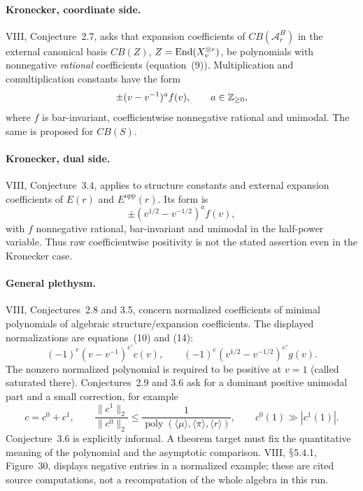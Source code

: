 \documentclass[11pt,a4paper]{article}
\renewcommand{\S}{\ensuremath{\mathsection}}
\theoremstyle{named}\newtheorem{finding}{Finding}[section]
\theoremstyle{definition}\newtheorem{definition}[finding]{Definition}
\theoremstyle{remark}\newtheorem{remark}[finding]{Remark}
\begin{document}
\paragraph{Kronecker, coordinate side.}
VIII, Conjecture~2.7, asks that expansion coefficients of $CB(\mathcal A_r^H)$ in the external canonical basis $CB(Z)$, $Z=\operatorname{End}(X_v^{\otimes r})$, be polynomials with nonnegative \emph{rational} coefficients (equation~(9)). Multiplication and comultiplication constants have the form
\begin{equation}\label{eq:kroneckerpositive}
 \pm(v-v^{-1})^a f(v),\qquad a\in\mathbb Z_{\ge0},
\end{equation}
where $f$ is bar-invariant, coefficientwise nonnegative rational and unimodal. The same is proposed for $CB(S)$.

\paragraph{Kronecker, dual side.}
VIII, Conjecture~3.4, applies to structure constants and external expansion coefficients of $E(r)$ and $E^{\mathrm{opp}}(r)$. Its form is
\begin{equation}\label{eq:dualpositive}
 \pm(v^{1/2}-v^{-1/2})^a f(v),
\end{equation}
with $f$ nonnegative rational, bar-invariant and unimodal in the half-power variable. Thus raw coefficientwise positivity is not the stated assertion even in the Kronecker case.

\paragraph{General plethysm.}
VIII, Conjectures~2.8 and 3.5, concern normalized coefficients of minimal polynomials of algebraic structure/expansion coefficients. The displayed normalizations are equations~(10) and (14):
\[
 (-1)^e(v-v^{-1})^{e'}c(v),\qquad
 (-1)^e(v^{1/2}-v^{-1/2})^{e'}g(v).
\]
The nonzero normalized polynomial is required to be positive at $v=1$ (called saturated there). Conjectures~2.9 and 3.6 ask for a dominant positive unimodal part and a small correction, for example
\[
 c=c^0+c^1,\qquad
 \frac{\|c^1\|_2}{\|c^0\|_2}
 \le\frac1{\operatorname{poly}(\langle\mu\rangle,\langle\pi\rangle,\langle r\rangle)},
 \qquad c^0(1)\gg |c^1(1)|.
\]
Conjecture~3.6 is explicitly informal. A theorem target must fix the quantitative meaning of the polynomial and the asymptotic comparison. VIII, \S5.4.1, Figure~30, displays negative entries in a normalized example; these are cited source computations, not a recomputation of the whole algebra in this run.
\end{document}
